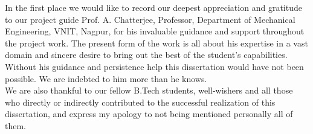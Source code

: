 In the first place we would like to record our deepest appreciation and gratitude to our project guide Prof. A. Chatterjee, Professor, Department of Mechanical Engineering, VNIT, Nagpur, for his invaluable guidance and support throughout the project work. The present form of the work is all about his expertise in a vast domain and sincere desire to bring out the best of the student’s capabilities. Without his guidance and persistence help this dissertation would have not been possible. We are indebted to him more than he knows.\\[0.5cm]
We are also thankful to our fellow B.Tech students, well-wishers and all those who directly or indirectly contributed to the successful realization of this dissertation, and express my apology to not being mentioned personally all of them.
%
